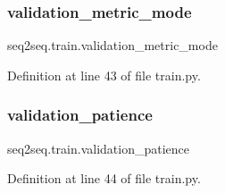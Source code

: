 \subsubsection{\texorpdfstring{validation\+\_\+metric\+\_\+mode}{validation\_metric\_mode}}
{\footnotesize\ttfamily seq2seq.\+train.\+validation\+\_\+metric\+\_\+mode}



Definition at line 43 of file train.\+py.

\mbox{\label{namespaceseq2seq_1_1train_aaa30160a61d83c6432812a34488992ee}} 
\subsubsection{\texorpdfstring{validation\+\_\+patience}{validation\_patience}}
{\footnotesize\ttfamily seq2seq.\+train.\+validation\+\_\+patience}



Definition at line 44 of file train.\+py.

